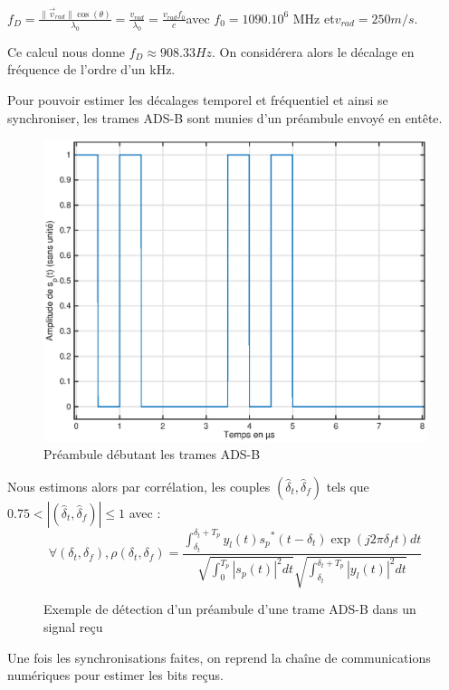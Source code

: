\documentclass[a4paper, 10pt]{article}
\begin{document}
    $f_D = \displaystyle\frac{\|\overrightarrow{v}_{rad}\| \cos(\theta)}{\lambda_0} = \frac{v_{rad}}{\lambda_0} = \frac{v_{rad}f_0}{c}$\quad avec $f_0 = 1090.10^6$ MHz \;\;et\;\;$v_{rad} = 250 m/s$.
    
    \vspace{11pt}
    \noindent
    Ce calcul nous donne $\boxed{f_D \approx 908.33Hz}$. On considérera alors le décalage en fréquence de l'ordre d'un kHz.
    
    \vspace{11pt}
    \noindent
    Pour pouvoir estimer les décalages temporel et fréquentiel et ainsi se synchroniser, les trames ADS-B sont munies d'un préambule envoyé en entête.
    
    \begin{figure}[h!]
        \centering
        \includegraphics[scale=0.3]{preamble.eps}
        \caption{Préambule débutant les trames ADS-B}
    \end{figure}
    \noindent
    Nous estimons alors par corrélation, les couples $\left(\hat{\delta}_t, \hat{\delta}_f\right)$ tels que $0.75 < \left|\left(\hat{\delta}_t, \hat{\delta}_f\right) \right| \le 1$ avec :
    \[
        \forall \left(\delta_t, \delta_f\right), \rho\left(\delta_t, \delta_f\right) = \frac{\displaystyle\int^{\delta_t + T_p}_{\delta_t}{y_l(t) {s_p}^*\left(t - \delta_t\right) \exp\left(j2\pi\delta_f t\right)dt}}{\displaystyle\sqrt{\int_{0}^{T_p}{\left|s_p(t)\right|^2 dt}}\displaystyle\sqrt{\int^{\delta_t + T_p}_{\delta_t}{\left|y_l(t)\right|^2 dt}}}
    \]
    
    \begin{figure}[h!]
        \centering
        
        \caption{Exemple de détection d'un préambule d'une trame ADS-B dans un signal reçu}
    \end{figure}
    \noindent
    Une fois les synchronisations faites, on reprend la chaîne de communications numériques pour estimer les bits reçus.
\end{document}
